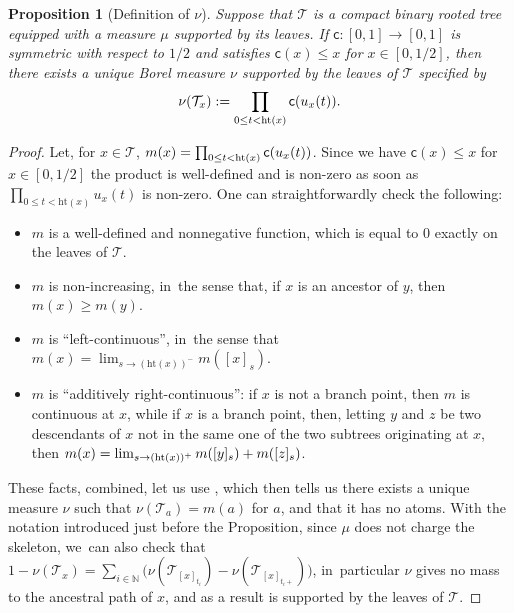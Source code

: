 \documentclass[11pt]{article}
\newcommand{\T}{\mathcal{T}}\let\CRT\T\let\tbr\T
\newcommand{\h}{\mathrm{ht}}
\newtheorem{prop}[thm]{Proposition}
\theoremstyle{definition}
\begin{document}
\begin{prop}[Definition of $\nu$]\label{prop:def:nu} Suppose that $ \mathcal{T}$ is a compact binary rooted tree equipped with a measure $\mu$ supported by its leaves. If $\mathsf{c}:[0,1] \to [0,1]$ is symmetric with respect to $1/2$ and satisfies $ \mathsf{c}(x) \leq x$ for $x \in [0,1/2]$, then there exists a unique Borel measure $\nu$ supported by the leaves of $ \mathcal{T}$ specified by
\begin{equation} \nu(\T_x) := \prod_{0 \leq t < \h(x)} \ff(u_x(t)).
\end{equation}
\end{prop}
\begin{proof} Let, for $x\in\T$, $m(x)=\prod_{0 \leq t < \h(x)} \ff(u_x(t))$. Since we have $ \mathsf{c}(x) \leq x$ for $x \in [0,1/2]$ the product is well-defined and is non-zero as soon as $\prod_{0 \leq t < \h(x)} u_x(t)$ is non-zero. One can straightforwardly check the following:
\begin{itemize}
\item $m$ is a well-defined and nonnegative function, which is equal to $0$ exactly on the leaves of $ \mathcal{T}$.
\item $m$ is non-increasing, in~the sense that, if $x$ is an ancestor of $y$, then $m(x)\geq m(y)$.
\item $m$ is ``left-continuous'', in~the sense that $m(x)=\lim_{s\to (\mathrm{ht}(x))^{-}} m([x]_s)$.
\item $m$ is ``additively right-continuous'': if $x$ is not a branch point, then $m$ is continuous at $x$, while if $x$ is a branch point, then, letting $y$ and $z$ be two descendants of $x$ not in the same one of the two subtrees originating at $x$, then $m(x)= \lim_{s\to (\mathrm{ht}(x))^+} m([y]_s)+\nobreak m([z]_s)$.
\end{itemize}
These facts, combined, let us use \cite[Prop.\,1]{Steph13}, which then tells us there exists a unique measure $\nu$ such that $\nu(\T_a)=m(a)$ for $a$, and that it has no atoms. With the notation introduced just before the Proposition, since $\mu$ does not charge the skeleton, we~can also check that $1-\nu(\mathcal{T}_x) = \sum_{i \in \mathbb{N}} \big(\nu (\mathcal{T}_{[x]_{t_i}}) -\nu (\mathcal{T}_{[x]_{t_i +}})\big)$, in~particular $\nu$ gives no mass to the ancestral path of $x$, and as a result is supported by the leaves of $ \mathcal{T}$.
\end{proof}
\end{document}
